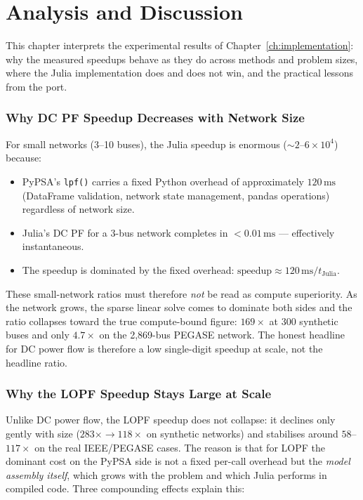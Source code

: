 \chapter{Analysis and Discussion}
\label{sec:analysis}

This chapter interprets the experimental results of Chapter~\ref{ch:implementation}: why the measured speedups behave as they do across methods and problem sizes, where the Julia implementation does and does not win, and the practical lessons from the port.


\subsection{Why DC PF Speedup Decreases with Network Size}

For small networks (3--10 buses), the Julia speedup is enormous ($\sim$$2$--$6\times10^{4}$) because:
\begin{itemize}
    \item PyPSA's \texttt{lpf()} carries a fixed Python overhead of approximately $120\,\text{ms}$ (DataFrame validation, network state management, pandas operations) regardless of network size.
    \item Julia's DC PF for a 3-bus network completes in $< 0.01\,\text{ms}$ --- effectively instantaneous.
    \item The speedup is dominated by the fixed overhead: $\text{speedup} \approx 120\,\text{ms} / t_\text{Julia}$.
\end{itemize}

These small-network ratios must therefore \emph{not} be read as compute superiority. As the network grows, the sparse linear solve comes to dominate both sides and the ratio collapses toward the true compute-bound figure: $169\times$ at 300 synthetic buses and only $4.7\times$ on the 2{,}869-bus PEGASE network. The honest headline for DC power flow is therefore a low single-digit speedup at scale, not the headline ratio.

\subsection{Why the LOPF Speedup Stays Large at Scale}

Unlike DC power flow, the LOPF speedup does not collapse: it declines only gently with size ($283\times \to 118\times$ on synthetic networks) and stabilises around $58$--$117\times$ on the real IEEE/PEGASE cases. The reason is that for LOPF the dominant cost on the PyPSA side is not a fixed per-call overhead but the \emph{model assembly itself}, which grows with the problem and which Julia performs in compiled code. Three compounding effects explain this:


